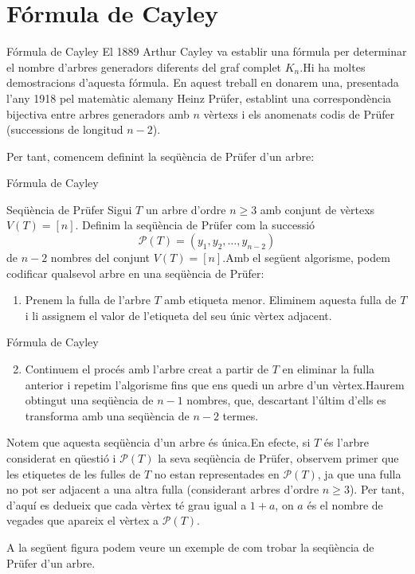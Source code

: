\documentclass{beamer}
\begin{document}
\section{Fórmula de Cayley}
\begin{frame}{Fórmula de Cayley}
    El 1889 Arthur Cayley va establir una fórmula per determinar el nombre d'arbres generadors diferents del graf complet $K_n$.\pause\space Hi ha moltes demostracions d'aquesta fórmula. En aquest treball en donarem una, presentada l'any 1918 pel matemàtic alemany Heinz Prüfer, establint una correspondència bijectiva entre arbres generadors amb $n$ vèrtexs i els anomenats codis de Prüfer (successions de longitud $n-2$). \pause\par Per tant, comencem definint la seqüència de Prüfer d'un arbre:
\end{frame}
\begin{frame}{Fórmula de Cayley}
\begin{block}{Seqüència de Prüfer}
Sigui $T$ un arbre d'ordre $n \geq 3$ amb conjunt de vèrtexs $V(T)= [n]$. Definim la seqüència de Prüfer com la successió
$$\mathcal{P}(T)=(y_1,y_2,\ldots,y_{n-2})$$
de $n-2$ nombres del conjunt $V(T)=[n]$.\pause\space Amb el següent algorisme, podem codificar qualsevol arbre en una seqüència de Prüfer:
\begin{enumerate}
\item Prenem la fulla de l'arbre $T$ amb etiqueta menor. Eliminem aquesta fulla de $T$ i li assignem el valor de l'etiqueta del seu únic vèrtex adjacent.
\end{enumerate}
\end{block}
\end{frame}
\begin{frame}{Fórmula de Cayley}
\begin{block}{}
\begin{enumerate}
    \setcounter{enumi}{1}
    \item Continuem el procés amb l'arbre creat a partir de $T$ en eliminar la fulla anterior i repetim l'algorisme fins que ens quedi un arbre d'un vèrtex.\pause\space Haurem obtingut una seqüència de $n-1$ nombres, que, descartant l'últim d'ells es transforma amb una seqüència de $n-2$ termes.
\end{enumerate}
\end{block}\pause
    Notem que aquesta seqüència d'un arbre és única.\pause\space En efecte, si $T$ és l'arbre considerat en qüestió i $\mathcal{P}(T)$ la seva seqüència de Prüfer, observem primer que les etiquetes de les fulles de $T$ no estan representades en $\mathcal{P}(T)$, ja que una fulla no pot ser adjacent a una altra fulla (considerant arbres d'ordre $n\geq 3$). Per tant, d'aquí es dedueix que cada vèrtex té grau igual a $1+a$, on $a$ és el nombre de vegades que apareix el vèrtex a $\mathcal{P}(T)$.\pause\par A la següent figura podem veure un exemple de com trobar la seqüència de Prüfer d'un arbre.
\end{frame}
\end{document}
